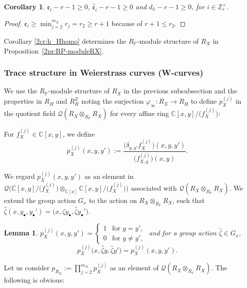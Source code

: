 \documentclass[pdftex]{sigma}
\def\CC{{\mathbb C}}
\def\ZZ{{\mathbb Z}}
\def\PP{{\mathbb P}}
\def\cQ{{\mathcal Q}}
\def\fe{{\mathfrak e}}
\def\hfe{{\widehat{\mathfrak e}}}
\def\hzeta{{\widehat \zeta}}
\numberwithin{equation}{section}
\newtheorem{Corollary}[Theorem]{Corollary}
\newtheorem{Lemma}[Theorem]{Lemma}
\begin{document}
\begin{Corollary}\label{2cr:h_X-h_X}
$\fe_i-r -1 \ge 0$, $\hfe_i -r -1 \ge 0$ and $d_h - r -1 \ge 0$, for $i \in \ZZ_r^\times$.
\end{Corollary}

\begin{proof}
$\fe_i\ge \min_{j=2}^{m_X} r_j = r_2\ge r+1$ because of $r+1 \le r_2$.
\end{proof}

\begin{Remark}\label{2rk:RP-moduleRX2}
Corollary \ref{2cr:h_Hhomo} determines the $R_\PP$-module structure of $R_X$ in Proposition~\ref{2pr:RP-moduleRX}.
\end{Remark}

\subsubsection{Trace structure in Weierstrass curves (W-curves)}\label{2sssc:TraceStrWcurves}

We use the $R_\PP$-module structure of $R_X$ in the previous subsubsection and the properties in $R_H$ and $R_H^Z$ noting the surjection $\varphi_\infty\colon R_X\to R_H$ to define $p_X^{(j)}$ in the quotient field $\cQ(R_X\otimes_{R_\PP} R_X)$ for every affine ring $\CC[x,y]/\big(f_X^{(j)}\big)$:
\begin{Definition}\label{2df:p_Xj}
For $f_X^{(j)}\in \CC[x, y]$, we define
\[
p_X^{(j)}(x,y,y'):=\frac{
\big(\delta_{y,y'} f_X^{(j)}\big)(x,y,y')}{\big(f_{X,y}^{(j)}\big)(x,y)}.
\]
\end{Definition}

We regard $p_X^{(j)}(x,y,y')$ as an element in $\cQ\big(\CC[x,y]/\big(f_X^{(j)}\big)\otimes_{\CC[x]} \CC[x,y]/\big(f_X^{(j)}\big)\big)$ associated with $\cQ(R_X\otimes_{R_\PP} R_X)$.
We extend the group action $G_x$ to the action on $R_X\otimes_{R_\PP} R_X$, such that $\hzeta (x, y_\bullet, y_\bullet')= \big(x, \hzeta y_\bullet, \hzeta y_\bullet'\big)$.

\begin{Lemma}\label{2lm:p_Xj}
$p_X^{(j)}(x,y,y')=\begin{cases}
1 & \text{for } y = y',\\
0 & \text{for } y \neq y',
\end{cases}$
and for a group action
$\hzeta\in G_x$,
\[
p_X^{(j)}\big(x,\hzeta y,\hzeta y'\big)=p_X^{(j)}(x,y,y').
\]
\end{Lemma}

Let us consider $p_{R_X}:=\prod_{j=2}^{m_X} p_X^{(j)}$ as an element of $\cQ(R_X\otimes_{R_\PP} R_X)$.
The following is obvious:
\end{document}
